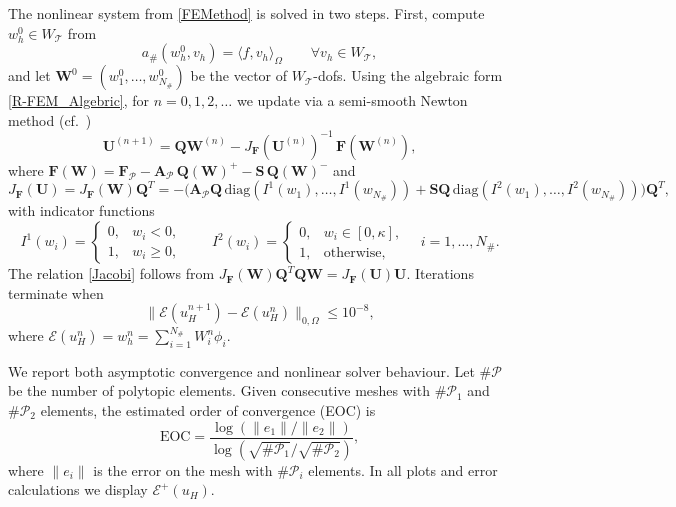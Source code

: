 \documentclass[11pt,final]{amsart}
\theoremstyle{plain}
\theoremstyle{definition}
\newcommand\calP{{\mathcal{P}}}
\newcommand\calT{{\mathcal{T}}}
\begin{document}
The nonlinear system from \eqref{FEMethod} is solved in two
steps. First, compute $w_h^0\in W_\calT$ from
\begin{equation}
  a_{\#}(w_{h}^{0},v_{h})=\langle f, v_{h}\rangle_{\Omega} \qquad \forall v_{h}\in W_\calT,
  \label{iter}
\end{equation}
and let $\mathbf{W}^0=(w_1^0,\ldots,w_{N_{\#}}^0)$ be the vector of
$W_\calT$-dofs. Using the algebraic form \eqref{R-FEM_Algebric}, for
$n=0,1,2,\ldots$ we update via a semi-smooth Newton method
(cf.~\cite{argyros1988newton})
\begin{equation}
  \mathbf{U}^{(n+1)}=\mathbf{Q}\mathbf{W}^{(n)}-J_{\mathbf{F}}(\mathbf{U}^{(n)})^{-1}\,\mathbf{F}(\mathbf{W}^{(n)}),
  \label{Newton}
\end{equation}
where $\mathbf{F}(\mathbf{W})=\mathbf{F}_\calP-\mathbf{A}_\calP\,\mathbf{Q}(\mathbf{W})^{+}-\mathbf{S}\,\mathbf{Q}(\mathbf{W})^{-}$ and
\begin{equation}
  J_{\mathbf{F}}(\mathbf{U})=J_{\mathbf{F}}(\mathbf{W})\mathbf{Q}^T
  =-\Big(\mathbf{A}_\calP\mathbf{Q}\,\mathrm{diag}(I^{1}(w_1),\ldots,I^{1}(w_{N_{\#}}))
  +\mathbf{S}\mathbf{Q}\,\mathrm{diag}(I^{2}(w_1),\ldots,I^{2}(w_{N_{\#}}))\Big)\mathbf{Q}^{T},
  \label{Jacobi}
\end{equation}
with indicator functions
\[
I^1(w_i)=\begin{cases}0,& w_i<0,\\ 1,& w_i\ge 0,\end{cases}
\qquad
I^2(w_i)=\begin{cases}0,& w_i\in[0,\kappa],\\ 1,& \text{otherwise},\end{cases}
\quad i=1,\ldots,N_{\#}.
\]
The relation \eqref{Jacobi} follows from
$J_{\mathbf{F}}(\mathbf{W})\mathbf{Q}^{T}\mathbf{Q}\mathbf{W}=J_{\mathbf{F}}(\mathbf{U})\mathbf{U}$. Iterations
terminate when
\begin{equation}
  \|\mathcal{E}(u_H^{n+1})-\mathcal{E}(u_H^{n})\|_{0,\Omega}\le 10^{-8},
  \label{stopping}
\end{equation}
where $\mathcal{E}(u_H^n)=w_h^n=\sum_{i=1}^{N_{\#}}W_i^n\phi_i$.

We report both asymptotic convergence and nonlinear solver
behaviour. Let $\#\calP$ be the number of polytopic elements. Given
consecutive meshes with $\#\calP_1$ and $\#\calP_2$ elements, the
estimated order of convergence (EOC) is
\begin{equation}
  \mathrm{EOC}
  = \frac{\log\!\left(\|e_{1}\|/\|e_{2}\|\right)}
         {\log\!\left(\sqrt{\#\calP_1}/\sqrt{\#\calP_2}\right)},
  \label{OOC}
\end{equation}
where $\|e_i\|$ is the error on the mesh with $\#\calP_i$ elements. In all plots and error calculations we display $\mathcal{E}^{+}(u_H)$.
\end{document}
